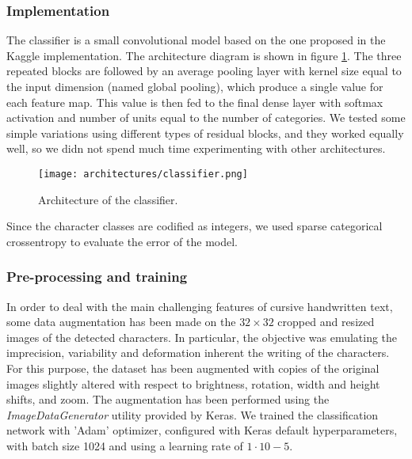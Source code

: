 \subsubsection{Implementation}
\label{sssec:implementationclass}

\label{ssssec:networkarchitectureclass}

The classifier is a small convolutional model based on the one proposed in the Kaggle implementation. The architecture diagram is shown in figure \ref{fig:classifier}. The three repeated blocks are followed by an average pooling layer with kernel size equal to the input dimension (named global pooling), which produce a single value for each feature map. This value is then fed to the final dense layer with softmax activation and number of units equal to the number of categories. We tested some simple variations using different types of residual blocks, and they worked equally well, so we didn not spend much time experimenting with other architectures.

\begin{figure}[h]
	\caption{Architecture of the classifier.}
	\centering
	\texttt{[image: architectures/classifier.png]}
	\label{fig:classifier}
\end{figure}

\label{ssssec:lossfunctionclass}

Since the character classes are codified as integers, we used sparse categorical crossentropy to evaluate the error of the model. 

\subsubsection{Pre-processing and training}
\label{sssec:preprocessingclass}

In order to deal with the main challenging features of cursive handwritten text, some data augmentation has been made on the $32 \times 32$ cropped and resized images of the detected characters. In particular, the objective was emulating the imprecision, variability and deformation inherent the writing of the characters. For this purpose, the dataset has been augmented with copies of the original images slightly altered with respect to brightness, rotation, width and height shifts, and zoom. The augmentation has been performed using the \textit{ImageDataGenerator} utility provided by Keras. 
We trained the classification network with 'Adam' optimizer, configured with Keras default hyperparameters, with batch size 1024 and using a learning rate of $1 \cdot 10-5$.